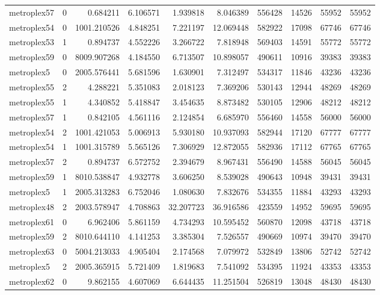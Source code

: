 \begin{longtable}{|l|r|r|r|r|r|r|r|r|r|}
metroplex57 & 0 & 0.684211 & 6.106571 & 1.939818 & 8.046389 & 556428 & 14526 & 55952 & 55952 \\
metroplex54 & 0 & 1001.210526 & 4.848251 & 7.221197 & 12.069448 & 582922 & 17098 & 67746 & 67746 \\
metroplex53 & 1 & 0.894737 & 4.552226 & 3.266722 & 7.818948 & 569403 & 14591 & 55772 & 55772 \\
metroplex59 & 0 & 8009.907268 & 4.184550 & 6.713507 & 10.898057 & 490611 & 10916 & 39383 & 39383 \\
metroplex5 & 0 & 2005.576441 & 5.681596 & 1.630901 & 7.312497 & 534317 & 11846 & 43236 & 43236 \\
metroplex55 & 2 & 4.288221 & 5.351083 & 2.018123 & 7.369206 & 530143 & 12944 & 48269 & 48269 \\
metroplex55 & 1 & 4.340852 & 5.418847 & 3.454635 & 8.873482 & 530105 & 12906 & 48212 & 48212 \\
metroplex57 & 1 & 0.842105 & 4.561116 & 2.124854 & 6.685970 & 556460 & 14558 & 56000 & 56000 \\
metroplex54 & 2 & 1001.421053 & 5.006913 & 5.930180 & 10.937093 & 582944 & 17120 & 67777 & 67777 \\
metroplex54 & 1 & 1001.315789 & 5.565126 & 7.306929 & 12.872055 & 582936 & 17112 & 67765 & 67765 \\
metroplex57 & 2 & 0.894737 & 6.572752 & 2.394679 & 8.967431 & 556490 & 14588 & 56045 & 56045 \\
metroplex59 & 1 & 8010.538847 & 4.932778 & 3.606250 & 8.539028 & 490643 & 10948 & 39431 & 39431 \\
metroplex5 & 1 & 2005.313283 & 6.752046 & 1.080630 & 7.832676 & 534355 & 11884 & 43293 & 43293 \\
metroplex48 & 2 & 2003.578947 & 4.708863 & 32.207723 & 36.916586 & 423559 & 14952 & 59695 & 59695 \\
metroplex61 & 0 & 6.962406 & 5.861159 & 4.734293 & 10.595452 & 560870 & 12098 & 43718 & 43718 \\
metroplex59 & 2 & 8010.644110 & 4.141253 & 3.385304 & 7.526557 & 490669 & 10974 & 39470 & 39470 \\
metroplex63 & 0 & 5004.213033 & 4.905404 & 2.174568 & 7.079972 & 532849 & 13806 & 52742 & 52742 \\
metroplex5 & 2 & 2005.365915 & 5.721409 & 1.819683 & 7.541092 & 534395 & 11924 & 43353 & 43353 \\
metroplex62 & 0 & 9.862155 & 4.607069 & 6.644435 & 11.251504 & 526819 & 13048 & 48430 & 48430 \\

\end{longtable}
